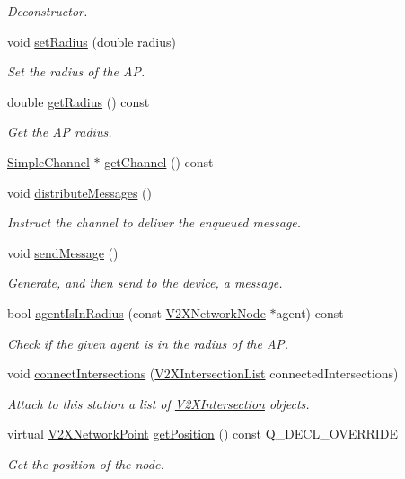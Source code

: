 \begin{DoxyCompactItemize}
\begin{DoxyCompactList}\small\item\em Deconstructor. \end{DoxyCompactList}\item 
void \hyperlink{classV2XSimpleAP_a669bd3709cf5631e0da5f6412ff4593d}{set\+Radius} (double radius)
\begin{DoxyCompactList}\small\item\em Set the radius of the AP. \end{DoxyCompactList}\item 
double \hyperlink{classV2XSimpleAP_a44f3bb9ed8c1856a927fcc8ba5ec319f}{get\+Radius} () const 
\begin{DoxyCompactList}\small\item\em Get the AP radius. \end{DoxyCompactList}\item 
\hyperlink{classSimpleChannel}{Simple\+Channel} $\ast$ \hyperlink{classV2XSimpleAP_a621e3150595e2b09aeb3256558b49df4}{get\+Channel} () const 
\item 
void \hyperlink{classV2XSimpleAP_a79f0af47be5552753fe632c78f2ec6bc}{distribute\+Messages} ()
\begin{DoxyCompactList}\small\item\em Instruct the channel to deliver the enqueued message. \end{DoxyCompactList}\item 
void \hyperlink{classV2XSimpleAP_a8fd56e48cf5831064528e9bbe4326f78}{send\+Message} ()
\begin{DoxyCompactList}\small\item\em Generate, and then send to the device, a message. \end{DoxyCompactList}\item 
bool \hyperlink{classV2XSimpleAP_a333f26e24a11969ce54316625e14fa17}{agent\+Is\+In\+Radius} (const \hyperlink{classV2XNetworkNode}{V2\+X\+Network\+Node} $\ast$agent) const 
\begin{DoxyCompactList}\small\item\em Check if the given agent is in the radius of the AP. \end{DoxyCompactList}\item 
void \hyperlink{classV2XSimpleAP_a0a31c16445c79095f6f8bbdaa8265fd3}{connect\+Intersections} (\hyperlink{group__V2XFramework_ga22a1c07fac7df77efff8f0d4f6f3c248}{V2\+X\+Intersection\+List} connected\+Intersections)
\begin{DoxyCompactList}\small\item\em Attach to this station a list of \hyperlink{classV2XIntersection}{V2\+X\+Intersection} objects. \end{DoxyCompactList}\item 
virtual \hyperlink{classV2XNetworkPoint}{V2\+X\+Network\+Point} \hyperlink{classV2XSimpleAP_ad83fd3c047d9fef2e88c54297171106f}{get\+Position} () const Q\+\_\+\+D\+E\+C\+L\+\_\+\+O\+V\+E\+R\+R\+I\+DE
\begin{DoxyCompactList}\small\item\em Get the position of the node. \end{DoxyCompactList}\end{DoxyCompactItemize}
